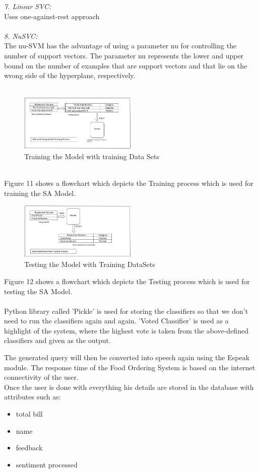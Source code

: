 \documentclass[conference]{IEEEtran}
\begin{document}
	\textit{7. Linear SVC: }\\
	Uses one-against-rest approach\\\\
	\textit{8. NuSVC:} \\
	The nu-SVM has the advantage of using a parameter nu for controlling the number of support vectors. The parameter nu represents the lower and upper bound on the number of examples that are support vectors and that lie on the wrong side of the hyperplane, respectively. \\\\
\begin{figure}[!ht]
	\centering
	\includegraphics[width=0.5\textwidth]{train.png}
	\caption{Training the Model with training Data Sets}
\end{figure}
\\
Figure 11 shows a flowchart which depicts the Training process which is used for training the SA Model.



\begin{figure}[!ht]
	\centering
	\includegraphics[width=0.5\textwidth]{test.png}
	\caption{Testing the Model with Training DataSets}
\end{figure}

Figure 12 shows a flowchart which depicts the Testing process which is used for testing the SA Model.\\\\
Python library called 'Pickle' is used for storing the classifiers so that we don't need to run the classifiers again and again. 'Voted Classifier' is used as a highlight of the system, where the highest vote is taken from the above-defined classifiers and given as the output.

\bigskip
The generated query will then be converted into speech again using the Espeak module.
The response time of the Food Ordering System is based on the internet connectivity of the user.\\
Once the user is done with everything his details are stored in the database with attributes such as:
\begin{itemize}
	\item total bill
	\item name
	\item feedback
	\item sentiment processed
\end{itemize}
\end{document}
